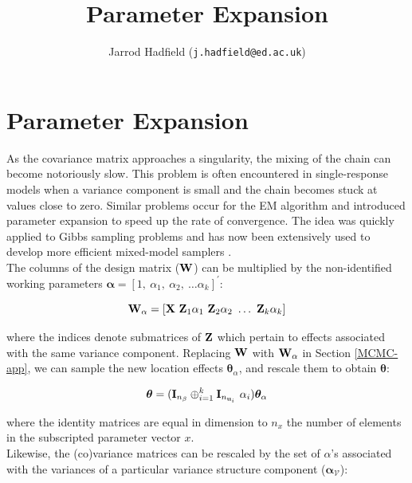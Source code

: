 \documentclass{article}
\title{Parameter Expansion}
\author{Jarrod Hadfield (\texttt{j.hadfield@ed.ac.uk})}
\begin{document}
\maketitle
\else
\chapter{Parameter Expansion}
\label{secPX}
\fi

As the covariance matrix approaches a singularity, the mixing of the chain can become notoriously slow. This problem is often encountered in single-response models when a variance component is small and the chain becomes stuck at values close to zero.  Similar problems occur for the EM algorithm and \citet{Liu.1998} introduced parameter expansion to speed up the rate of convergence. The idea was quickly applied to Gibbs sampling problems \citep{Liu.1999} and has now been extensively used to develop more efficient mixed-model samplers \citep[e.g.][]{vanDyk.2001, Gelman.2008b, Browne.2009}.\\

The columns of the design matrix (${\bf W}$) can be multiplied by the non-identified working parameters ${\bm \alpha} = \left[1,\ \alpha_{1},\ \alpha_{2},\ \dots \alpha_{k}\right]^{'}$:

\begin{equation} 
{\bf W}_{\alpha} = \left[{\bf X}\ {\bf Z}_{1}\alpha_{1}\ {\bf Z}_{2}\alpha_{2}\ \dots\ {\bf Z}_{k}\alpha_{k}\right]
\label{wstar}
\end{equation}

where the indices denote submatrices of ${\bf Z}$ which pertain to effects associated with the same variance component. Replacing  ${\bf W}$ with ${\bf W}_{\alpha}$ in Section \ref{MCMC-app}, we can sample the new location effects  ${\bm \theta}_{\alpha}$, and rescale them to obtain ${\bm \theta}$:

\begin{equation} 
{\bm \theta} = ({\bf I}_{n_{\bf \beta}}\oplus_{i=1}^{k}{\bf I}_{n_{{\bf u}_{i}}}\ \alpha_{i}){\bm \theta}_{\alpha}
\end{equation}

where the identity matrices are equal in dimension to $n_{x}$ the number of elements in the subscripted parameter vector $x$.\\ 

Likewise, the (co)variance matrices can be rescaled by the set of $\alpha$'s associated with the variances of a particular variance structure component (${\bm \alpha}_{\mathcal{V}}$):
\end{document}
